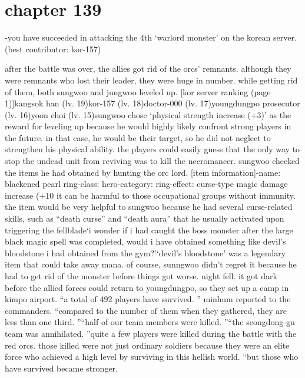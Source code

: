 \section{chapter 139}

                            -you have succeeded in attacking the 4th ‘warlord monster’ on the korean server.
 (best contributor: kor-157)




after the battle was over, the allies got rid of the orcs’ remnants.
 although they were remnants who lost their leader, they were huge in number.
 while getting rid of them, both sungwoo and jungwoo leveled up.
[kor server ranking (page 1)]kangsok han (lv.
 19)kor-157 (lv.
 18)doctor-000 (lv.
 17)youngdungpo prosecutor (lv.
 16)yoon choi (lv.
 15)sungwoo chose ‘physical strength increase (+3)’ as the reward for leveling up because he would highly likely confront strong players in the future.
 in that case, he would be their target, so he did not neglect to strengthen his physical ability.
the players could easily guess that the only way to stop the undead unit from reviving was to kill the necromancer.
sungwoo checked the items he had obtained by hunting the orc lord.
[item information]-name: blackened pearl ring-class: hero-category: ring-effect: curse-type magic damage increase (+10%
 it can be harmful to those occupational groups without immunity.
the item would be very helpful to sungwoo because he had several curse-related skills, such as “death curse” and “death aura” that he usually activated upon triggering the fellblade‘i wonder if i had caught the boss monster after the large black magic spell was completed, would i have obtained something like devil’s bloodstone i had obtained from the gym?’‘devil’s bloodstone’ was a legendary item that could take away mana.
 of course, sunngwoo didn’t regret it because he had to get rid of the monster before things got worse.
night fell.
it got dark before the allied forces could return to youngdungpo, so they set up a camp in kimpo airport.
“a total of 492 players have survived.
”
minhum reported to the commanders.
“compared to the number of them when they gathered, they are less than one third.
”“half of our team members were killed.
”“the seongdong-gu team was annihilated.
”quite a few players were killed during the battle with the red orcs.
 those killed were not just ordinary soldiers because they were an elite force who achieved a high level by surviving in this hellish world.
“but those who have survived became stronger.
